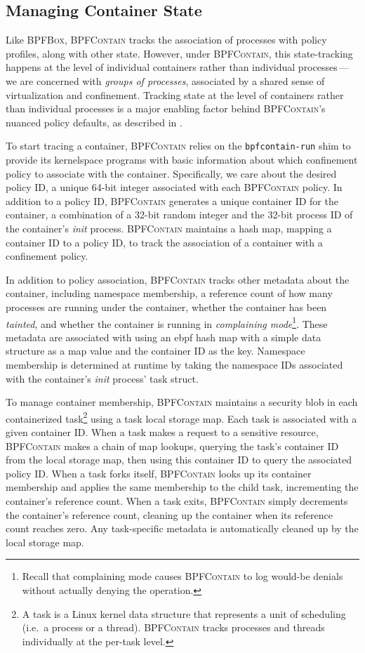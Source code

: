 \documentclass[
  fontsize=12pt,
  titlepage=firstiscover,
  paper=letter,
oneside,
  cleardoublepage=plain,
  parskip=half-,
  DIV=10,
  parindent,
  appendixprefix,
  chapterprefix,
  listof=totoc,
]{scrbook}
\newcommand{\bpfbox}{\textsc{BPFBox}}
\newcommand{\bpfcontain}{\textsc{BPFContain}}
\begin{document}
\subsection{Managing Container State}\label{ss:bpfcontain-state}

Like \bpfbox{}, \bpfcontain{} tracks the association of processes with policy profiles,
along with other state. However, under \bpfcontain{}, this state-tracking happens
at the level of individual containers rather than individual processes\,---\,we are
concerned with \textit{groups of processes}, associated by a shared sense of
virtualization and confinement. Tracking state at the level of containers rather than
individual processes is a major enabling factor behind \bpfcontain{}'s nuanced policy
defaults, as described in .

To start tracing a container, \bpfcontain{} relies on the \texttt{bpfcontain-run} shim to
provide its kernelspace programs with basic information about which confinement policy to
associate with the container. Specifically, we care about the desired policy ID, a unique
64-bit integer associated with each \bpfcontain{} policy. In addition to a policy ID,
\bpfcontain{} generates a unique container ID for the container, a combination of a 32-bit
random integer and the 32-bit process ID of the container's \textit{init} process.
\bpfcontain{} maintains a hash map, mapping a container ID to a policy ID, to track the
association of a container with a confinement policy.

In addition to policy association, \bpfcontain{} tracks other metadata about the
container, including namespace membership, a reference count of how many processes are
running under the container, whether the container has been \textit{tainted}, and whether
the container is running in \textit{complaining mode}\footnote{Recall that complaining
mode causes \bpfcontain{} to log would-be denials without actually denying the
operation.}. These metadata are associated with using an \gls{ebpf} hash map with a simple
data structure as a map value and the container ID as the key. Namespace membership is
determined at runtime by taking the namespace IDs associated with the container's
\textit{init} process' task struct.

To manage container membership, \bpfcontain{} maintains a security blob in each
containerized task\footnote{A task is a Linux kernel data structure that represents a unit of
scheduling (i.e.~a process or a thread). \bpfcontain{} tracks processes and threads
individually at the per-task level.} using a task local storage map. Each task is
associated with a given container ID. When a task makes a request to a sensitive resource,
\bpfcontain{} makes a chain of map lookups, querying the task's container ID from the
local storage map, then using this container ID to query the associated policy ID. When
a task forks itself, \bpfcontain{} looks up its container membership and applies the same
membership to the child task, incrementing the container's reference count. When a task
exits, \bpfcontain{} simply decrements the container's reference count, cleaning up the
container when its reference count reaches zero. Any task-specific metadata is
automatically cleaned up by the local storage map.
\end{document}
